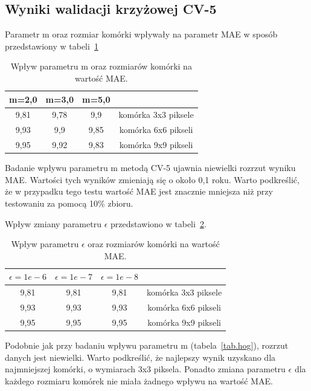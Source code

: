 \documentclass[a4paper,twoside,12pt]{book}
\begin{document}
    \subsection*{Wyniki walidacji krzyżowej CV-5}
    Parametr m oraz rozmiar komórki wpływały na parametr MAE w sposób przedstawiony w tabeli~\ref{tab.hog11}
    \begin{table}[]
        \centering
        \caption{Wpływ parametru m oraz rozmiarów komórki na wartość MAE.}
        \begin{tabular}{|c|c|c|c|}
            \hline
            m=2,0 & m=3,0 & m=5,0 &                     \\ \hline
            9,81 & 9,78 & 9,9 & komórka 3x3 piksele \\ \hline
            9,93 & 9,9 & 9,85 & komórka 6x6 pikseli \\ \hline
            9,95 & 9,92 & 9,83 & komórka 9x9 pikseli \\ \hline
        \end{tabular}
        \label{tab.hog11}
    \end{table}

    Badanie wpływu parametru m metodą CV-5 ujawnia niewielki rozrzut wyniku MAE.
    Wartości tych wyników zmieniają się o około 0,1 roku. Warto podkreślić, że w przypadku tego testu wartość MAE jest
    znacznie mniejsza
    niż
    przy testowaniu za pomocą 10\% zbioru.

    Wpływ zmiany parametru $\epsilon$ przedstawiono w tabeli~\ref{tab.hog12}.
    \begin{table}[]
        \centering
        \caption{Wpływ parametru $\epsilon$ oraz rozmiarów komórki na wartość MAE.}
        \begin{tabular}{|c|c|c|c|}
            \hline
            $\epsilon=1e-6$ &  $\epsilon=1e-7$ &  $\epsilon=1e-8$ &                     \\ \hline
            9,81 & 9,81 & 9,81 & komórka 3x3 piksele \\ \hline
            9,93 & 9,93 & 9,93 & komórka 6x6 pikseli \\ \hline
            9,95 & 9,95 & 9,95 & komórka 9x9 pikseli \\ \hline
        \end{tabular}
        \label{tab.hog12}
    \end{table}

    Podobnie jak przy badaniu wpływu parametru m (tabela~\ref{tab.hog}), rozrzut danych jest niewielki. Warto
    podkreślić, że najlepszy wynik uzyskano dla najmniejszej komórki, o wymiarach 3x3 piksela. Ponadto zmiana
    parametru $\epsilon$ dla
    każdego rozmiaru komórek nie miała żadnego wpływu na wartość MAE.
\end{document}
